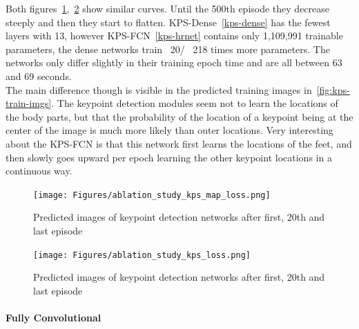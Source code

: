 Both figures~\ref{fig:kps-map-loss},~\ref{fig:kps-loss} show similar curves.
Until the 500th episode they decrease steeply and then they start to flatten.
KPS-Dense~\ref{kps-dense} has the fewest layers with 13, however KPS-FCN~\ref{kps-hrnet} contains only 1,109,991
trainable parameters, the dense networks train ~20/ ~218 times more parameters.
The networks only differ slightly in their training epoch time and are all between 63 and 69 seconds.\\
The main difference though is visible in the predicted training images in~\ref{fig:kps-train-imgs}.
The keypoint detection modules seem not to learn the locations of the body parts, but that the probability of the location
of a keypoint being at the center of the image is much more likely than outer locations.
Very interesting about the KPS-FCN is that this network first learns the locations of the feet, and then slowly goes
upward per epoch learning the other keypoint locations in a continuous way.


\begin{figure}[H]
    \centering
    \texttt{[image: Figures/ablation\_study\_kps\_map\_loss.png]}
    \decoRule
    \caption[Ablation Keypoints Detection Module: Predicted Training Images]{Predicted images of keypoint detection networks
    after first, 20th and last episode}
    \label{fig:kps-map-loss}
\end{figure}


\begin{figure}[H]
    \centering
    \texttt{[image: Figures/ablation\_study\_kps\_loss.png]}
    \decoRule
    \caption[Ablation Keypoints Detection Module: Predicted Training Images]{Predicted images of keypoint detection networks
    after first, 20th and last episode}
    \label{fig:kps-loss}
\end{figure}
\paragraph{Fully Convolutional}

